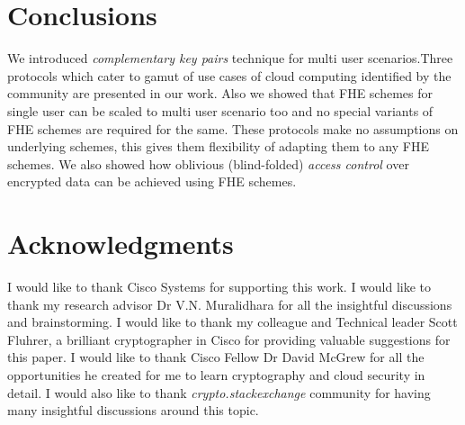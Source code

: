 \documentclass[conference]{IEEEtran}
\numberwithin{equation}{section}
\begin{document}
 \section{Conclusions}
   We introduced \emph{complementary key pairs} technique for multi user scenarios.Three protocols which cater to gamut of use cases of cloud computing identified by the community \cite {computing2010cloud} are presented in our work. Also we showed that FHE schemes for single user can be scaled to multi user scenario too and no special variants of FHE schemes are required for the same. These protocols make no assumptions on underlying schemes, this gives them flexibility of adapting them to any FHE schemes. We also showed how oblivious (blind-folded) \emph{access control} over encrypted data can be achieved using FHE schemes. \section{Acknowledgments}
I would like to thank Cisco Systems for  supporting this work. I would like to thank my research advisor Dr V.N. Muralidhara for all the insightful discussions and brainstorming. I would like to thank my colleague and Technical leader Scott Fluhrer, a brilliant cryptographer in Cisco for providing valuable suggestions for this paper. I would like to thank Cisco Fellow Dr David McGrew for all the opportunities he created for me to learn cryptography and cloud security in detail.  I would also like to thank \emph{crypto.stackexchange} community for having many insightful discussions around this topic.



















	
\end{document}
